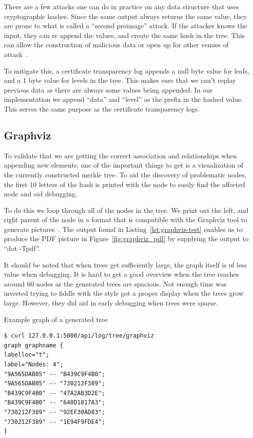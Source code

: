\documentclass[../Main/thesis.tex]{subfiles}
\begin{document}
There are a few attacks one can do in practice on any data structure that uses
cryptographic hashes. Since the same output always returns the same value, they
are prone to what is called a ``second preimage'' attack. If the
attacker knows the input, they can re append the values, and create the same hash
in the tree.  This can allow the construction of malicious data or open up for
other venues of attack~\cite{rfc4270}.

To mitigate this, a certificate transparency log appends a null byte value for
leafs, and a 1 byte value for levels in the tree. This makes sure that we can't
replay previous data as there are always some values being appended. In our
implementation we append ``data'' and ``level'' as the prefix in the hashed
value. This serves the same purpose as the certificate transparency logs.


\subsection*{Graphviz}%
\label{sub:graph_merkle_tree}
To validate that we are getting the correct association and relationships when
appending new elements, one of the important things to get is a visualization of
the currently constructed merkle tree. To aid the discovery of problematic
nodes, the first 10 letters of the hash is printed with the node to easily find
the affected node and aid debugging.

To do this we loop through all of the nodes in the tree. We print out the left,
and right parent of the node in a format that is compatible with the Graphviz
tool to generate pictures~\cite{Ellson01graphviz}. The output found in
Listing~\ref{lst:graphviz-test} enables us to produce the PDF picture in
Figure~\ref{fig:graphviz_pdf} by supplying the output to ``dot -Tpdf''.

It should be noted that when trees get sufficiently large, the graph itself is
of less value when debugging. It is hard to get a good overview when the tree
reaches around 60 nodes as the generated trees are spacious. Not enough time was
invested trying to fiddle with the style got a proper display when the trees
grow large. However, they did aid in early debugging when trees were sparse.

\begin{listing}[H]
\caption{Example graph of a generated tree}
\label{lst:graphviz-test}
\begin{verbatim}
$ curl 127.0.0.1:5000/api/log/tree/graphviz                        
graph graphname {
labelloc="t";
label="Nodes: 4";
"9A565DAB05" -- "B439C9F4B0";
"9A565DAB05" -- "730212F389";
"B439C9F4B0" -- "47A2AB3D2E";
"B439C9F4B0" -- "648D1817A3";
"730212F389" -- "92EF30AD83";
"730212F389" -- "1E94F9FDE4";
}
\end{verbatim}
\end{listing}
\end{document}
